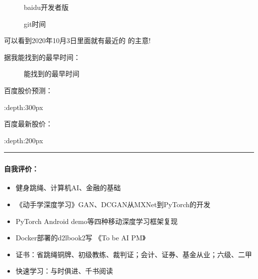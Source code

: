 \documentclass[letterpaper,10pt,english]{sphinxmanual}
\begin{document}
\begin{figure}[H]
\centering
\capstart

\noindent{}
\caption{baidu开发者版}\label{\detokenize{get_started:id14}}\end{figure}

\begin{figure}[H]
\centering
\capstart

\noindent{}
\caption{git时间}\label{\detokenize{get_started:id15}}\end{figure}

可以看到2020年10月3日里面就有最近的
 的主意!

据我能找到的最早时间：

\begin{figure}[H]
\centering
\capstart

\noindent{}
\caption{能找到的最早时间}\label{\detokenize{get_started:id16}}\end{figure}

百度股价预测：

\begin{center}\end{center} :depth:300px

百度最新股价：

\begin{center}\end{center} :depth:200px


\bigskip\hrule\bigskip




\subsubsection{}
\label{\detokenize{get_started:id1}}

\paragraph{自我评价：}
\label{\detokenize{get_started:id2}}\begin{itemize}
\item {} 
健身跳绳、计算机AI、金融的基础

\item {} 
《动手学深度学习》GAN、DCGAN从MXNet到PyTorch的开发

\item {} 
PyTorch Android demo等四种移动深度学习框架复现

\item {} 
Docker部署的d2lbook2写 《To be AI PM》

\item {} 
证书：省跳绳铜牌、初级教练、裁判证；会计、证券、基金从业；六级、二甲

\item {} 
快速学习：与时俱进、千书阅读

\end{itemize}
\end{document}
